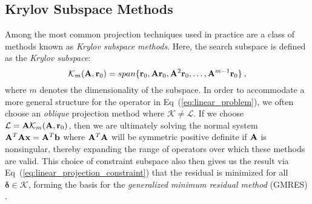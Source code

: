\subsection{Krylov Subspace Methods}
\label{subsec:krylov_methods}
Among the most common projection techniques used in practice are a
class of methods known as \textit{Krylov subspace methods}. Here, the
search subspace is defined as the \textit{Krylov subspace}:
\begin{equation}
  \mathcal{K}_m(\mathbf{A},\mathbf{r}_0) = span\{\mathbf{r}_0, \mathbf{A}\mathbf{r}_0,
  \mathbf{A}^2\mathbf{r}_0, \dots, \mathbf{A}^{m-1}\mathbf{r}_0\}\:,
  \label{eq:krylov_subspace}
\end{equation}
where $m$ denotes the dimensionality of the subspace. In order to
accommodate a more general structure for the operator in
Eq~(\ref{eq:linear_problem}), we often choose an \textit{oblique}
projection method where $\mathcal{K} \neq \mathcal{L}$. If we choose
$\mathcal{L} = \mathbf{A} \mathcal{K}_m(\mathbf{A},\mathbf{r}_0)$, then we are
ultimately solving the normal system $\mathbf{A}^T\mathbf{A}\mathbf{x} =
\mathbf{A}^T\mathbf{b}$ where $\mathbf{A}^T\mathbf{A}$ will be symmetric positive
definite if $\mathbf{A}$ is nonsingular, thereby expanding the range of
operators over which these methods are valid. This choice of
constraint subspace also then gives us the result via
Eq~(\ref{eq:linear_projection_constraint}) that the residual is
minimized for all $\boldsymbol{\delta} \in \mathcal{K}$, forming the
basis for the \textit{generalized minimum residual method} (GMRES)
\citep{saad_gmres:_1986}.

